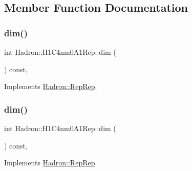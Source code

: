 \subsection{Member Function Documentation}
\mbox{\label{structHadron_1_1H1C4nm0A1Rep_a1df356297c0d6488269ed5066b7f2a60}} 
\subsubsection{\texorpdfstring{dim()}{dim()}\hspace{0.1cm}{\footnotesize\ttfamily [1/5]}}
{\footnotesize\ttfamily int Hadron\+::\+H1\+C4nm0\+A1\+Rep\+::dim (\begin{DoxyParamCaption}{ }\end{DoxyParamCaption}) const\hspace{0.3cm}{\ttfamily [inline]}, {\ttfamily [virtual]}}



Implements \mbox{\hyperlink{structHadron_1_1RepRep_a92c8802e5ed7afd7da43ccfd5b7cd92b}{Hadron\+::\+Rep\+Rep}}.

\mbox{\label{structHadron_1_1H1C4nm0A1Rep_a1df356297c0d6488269ed5066b7f2a60}} 
\subsubsection{\texorpdfstring{dim()}{dim()}\hspace{0.1cm}{\footnotesize\ttfamily [2/5]}}
{\footnotesize\ttfamily int Hadron\+::\+H1\+C4nm0\+A1\+Rep\+::dim (\begin{DoxyParamCaption}{ }\end{DoxyParamCaption}) const\hspace{0.3cm}{\ttfamily [inline]}, {\ttfamily [virtual]}}



Implements \mbox{\hyperlink{structHadron_1_1RepRep_a92c8802e5ed7afd7da43ccfd5b7cd92b}{Hadron\+::\+Rep\+Rep}}.

\mbox{\label{structHadron_1_1H1C4nm0A1Rep_a1df356297c0d6488269ed5066b7f2a60}} 
